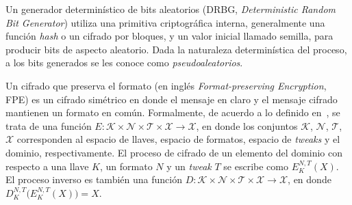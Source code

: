 

Un generador determinístico de bits aleatorios (DRBG, \textit{Deterministic
Random Bit Generator}) utiliza una primitiva criptográfica interna,
generalmente una función \textit{hash} o un cifrado por bloques, y un valor
inicial llamado semilla, para producir bits de aspecto aleatorio. Dada la
naturaleza determinística del proceso, a los bits generados se les conoce como
\textit{pseudoaleatorios}.



Un cifrado que preserva el formato (en inglés \textit{Format-preserving
Encryption}, FPE) es un cifrado simétrico en donde el mensaje en claro y el
mensaje cifrado mantienen un formato en común. Formalmente, de acuerdo a lo
definido en~\cite{DBLP:conf/sacrypt/BellareRRS09}, se trata de una función $ E:
\mathcal{K} \times \mathcal{N} \times \mathcal{T} \times \mathcal{X} \rightarrow
\mathcal{X} $, en donde los conjuntos $ \mathcal{K} $, $ \mathcal{N} $, $
\mathcal{T} $, $ \mathcal{X} $ corresponden al espacio de llaves, espacio de
formatos, espacio de \textit{tweaks} y el dominio, respectivamente. El proceso
de cifrado de un elemento del dominio con respecto a una llave $ K $, un formato
$ N $ y un \textit{tweak} $ T $ se escribe como  $ E_K^{N,T}(X) $. El proceso
inverso es también una función $ D: \mathcal{K} \times \mathcal{N} \times
\mathcal{T} \times \mathcal{X} \rightarrow \mathcal{X} $, en donde $
D_K^{N,T}\big( E_K^{N,T}(X) \big) = X $.

